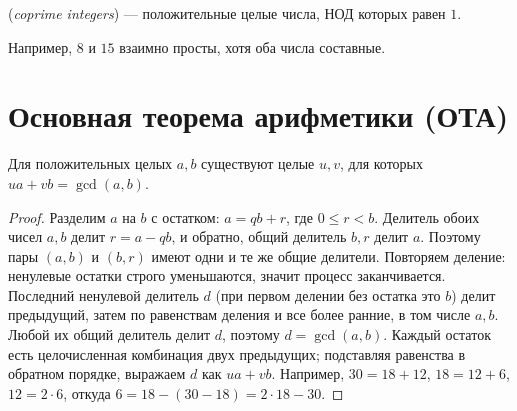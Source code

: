 \begin{definition}
 (\emph{coprime integers}) --- положительные целые числа, НОД которых равен \(1\).
\end{definition}
Например, \(8\) и \(15\) взаимно просты, хотя оба числа составные.

\section{Основная теорема арифметики (ОТА)}

\begin{theorem}\label{thm:bezout-preview}
Для положительных целых \(a,b\) существуют целые \(u,v\), для которых \(ua+vb=\gcd(a,b)\).
\end{theorem}
\begin{proof}Разделим \(a\) на \(b\) с остатком: \(a=qb+r\), где \(0\le r<b\). Делитель обоих чисел \(a,b\) делит \(r=a-qb\), и обратно, общий делитель \(b,r\) делит \(a\). Поэтому пары \((a,b)\) и \((b,r)\) имеют одни и те же общие делители. Повторяем деление: ненулевые остатки строго уменьшаются, значит процесс заканчивается. Последний ненулевой делитель \(d\) (при первом делении без остатка это \(b\)) делит предыдущий, затем по равенствам деления и все более ранние, в том числе \(a,b\). Любой их общий делитель делит \(d\), поэтому \(d=\gcd(a,b)\). Каждый остаток есть целочисленная комбинация двух предыдущих; подставляя равенства в обратном порядке, выражаем \(d\) как \(ua+vb\). Например, \(30=18+12\), \(18=12+6\), \(12=2\cdot6\), откуда \(6=18-(30-18)=2\cdot18-30\).\end{proof}

